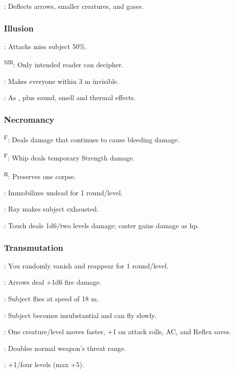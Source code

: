 	: Deflects arrows, smaller creatures, and gases.

\subsubsection{Illusion}
	: Attacks miss subject 50\%.

	\textsuperscript{MR}: Only intended reader can decipher.

	: Makes everyone within 3 m invisible.

	: As , plus sound, smell and thermal effects.

\subsubsection{Necromancy}
	\textsuperscript{F}: Deals damage that continues to cause bleeding damage. %

	\textsuperscript{F}: Whip deals temporary Strength damage. %

	\textsuperscript{R}: Preserves one corpse.

	: Immobilizes undead for 1 round/level.

	: Ray makes subject exhausted.

	: Touch deals 1d6/two levels damage; caster gains damage as hp.

\subsubsection{Transmutation}
	: You randomly vanish and reappear for 1 round/level.

	: Arrows deal +1d6 fire damage.

	: Subject flies at speed of 18 m.

	: Subject becomes insubstantial and can fly slowly.

	: One creature/level moves faster, +1 on attack rolls, AC, and Reflex saves.

	: Doubles normal weapon's threat range.

	: +1/four levels (max +5).

